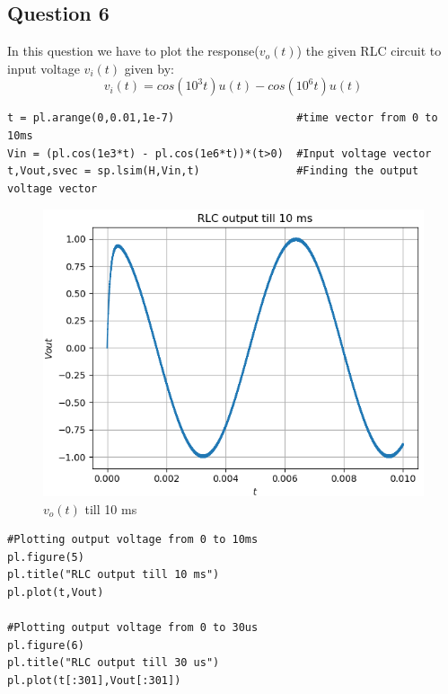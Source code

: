 \documentclass[11pt, a4paper]{article}
\begin{document}
\subsection{Question 6}
    In this question we have to plot the response($v_o(t)$) the given RLC circuit to input voltage $v_i(t)$ given by:
    \begin{equation*}
        v_i(t) = cos(10^3t)u(t) - cos(10^6t)u(t)
    \end{equation*}
    \begin{verbatim}
t = pl.arange(0,0.01,1e-7)                   #time vector from 0 to 10ms
Vin = (pl.cos(1e3*t) - pl.cos(1e6*t))*(t>0)  #Input voltage vector
t,Vout,svec = sp.lsim(H,Vin,t)               #Finding the output voltage vector
    \end{verbatim}
    \begin{figure}[!h]
        \centering
        \includegraphics[scale = 0.65]{Figure 6.png}
        \caption{$v_o(t)$ till 10 ms}
        \label{fig:Figure 6}
    \end{figure}
    \begin{verbatim}
#Plotting output voltage from 0 to 10ms
pl.figure(5)
pl.title("RLC output till 10 ms")
pl.plot(t,Vout)

#Plotting output voltage from 0 to 30us
pl.figure(6)
pl.title("RLC output till 30 us")
pl.plot(t[:301],Vout[:301])
    \end{verbatim}
\end{document}
